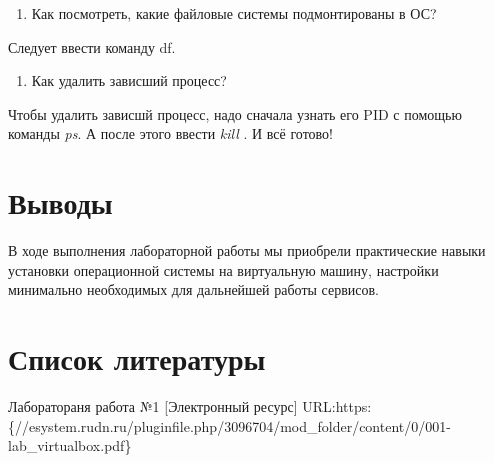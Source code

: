 \documentclass[
  english,
  russian,
  12pt,
  a4paper,
  DIV=11,
  numbers=noendperiod]{scrreprt}
\providecommand{\tightlist}{%
  \setlength{\itemsep}{0pt}\setlength{\parskip}{0pt}}
\begin{document}
\begin{enumerate}
\def\labelenumi{\arabic{enumi}.}
\setcounter{enumi}{3}
\tightlist
\item
  Как посмотреть, какие файловые системы подмонтированы в ОС?
\end{enumerate}

Следует ввести команду df.

\begin{enumerate}
\def\labelenumi{\arabic{enumi}.}
\setcounter{enumi}{4}
\tightlist
\item
  Как удалить зависший процесс?
\end{enumerate}

Чтобы удалить зависшй процесс, надо сначала узнать его PID с помощью
команды \emph{ps}. А после этого ввести \emph{kill }. И всё готово!

\chapter{Выводы}\label{ux432ux44bux432ux43eux434ux44b}

В ходе выполнения лабораторной работы мы приобрели практические навыки
установки операционной системы на виртуальную машину, настройки
минимально необходимых для дальнейшей работы сервисов.

\chapter*{Список
литературы}\label{ux441ux43fux438ux441ux43eux43a-ux43bux438ux442ux435ux440ux430ux442ux443ux440ux44b}

Лаборатораня работа №1 {[}Электронный ресурс{]}
URL:https:\{//esystem.rudn.ru/pluginfile.php/3096704/mod\_folder/content/0/001-lab\_virtualbox.pdf\}


\printbibliography
\end{document}
